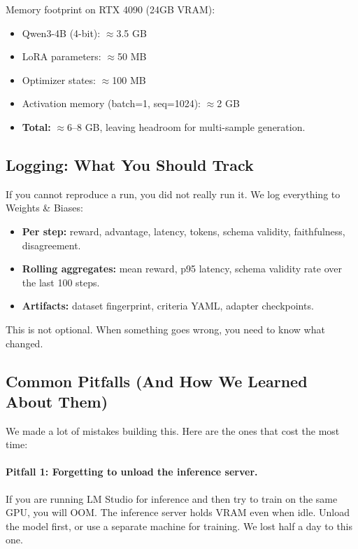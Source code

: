 \documentclass[11pt]{article}
\begin{document}
Memory footprint on RTX 4090 (24GB VRAM):
\begin{itemize}[leftmargin=12pt]
    \item Qwen3-4B (4-bit): $\approx$3.5 GB
    \item LoRA parameters: $\approx$50 MB
    \item Optimizer states: $\approx$100 MB
    \item Activation memory (batch=1, seq=1024): $\approx$2 GB
    \item \textbf{Total:} $\approx$6--8 GB, leaving headroom for multi-sample generation.
\end{itemize}

\subsection{Logging: What You Should Track}

If you cannot reproduce a run, you did not really run it.
We log everything to Weights \& Biases:
\begin{itemize}[leftmargin=12pt]
    \item \textbf{Per step:} reward, advantage, latency, tokens, schema validity, faithfulness, disagreement.
    \item \textbf{Rolling aggregates:} mean reward, p95 latency, schema validity rate over the last 100 steps.
    \item \textbf{Artifacts:} dataset fingerprint, criteria YAML, adapter checkpoints.
\end{itemize}

This is not optional.
When something goes wrong, you need to know what changed.

\subsection{Common Pitfalls (And How We Learned About Them)}

We made a lot of mistakes building this.
Here are the ones that cost the most time:

\paragraph{Pitfall 1: Forgetting to unload the inference server.}
If you are running LM Studio for inference and then try to train on the same GPU, you will OOM.
The inference server holds VRAM even when idle.
Unload the model first, or use a separate machine for training.
We lost half a day to this one.
\end{document}
